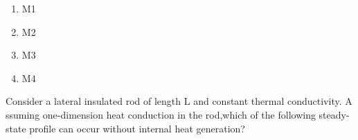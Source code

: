 \begin{figure}[!ht]
\centering
{}%

\label{fig:my_label}
\end{figure}
\begin{enumerate}
    \item M1
    \item M2
    \item M3
    \item M4
\end{enumerate}
\item Consider a lateral insulated rod of length L and constant thermal conductivity. A ssuming one-dimension heat conduction in the rod,which of the following steady-state profile can occur without internal heat generation?
